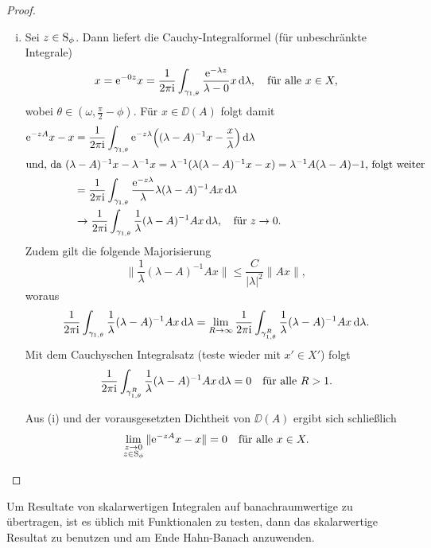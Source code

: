 \begin{proof}
\begin{enumerate}[(i)]
    \item Sei $z \in \mathrm{S}_\phi$. 
      Dann liefert die Cauchy-Integralformel (für unbeschränkte Integrale)
      $$
      x 
      = \mathrm{e}^{-0z} x
      = \frac{1}{2\pi \mathrm{i}} \int_{\gamma_{1,\theta}} \frac{\mathrm{e}^{-\lambda z}}{\lambda - 0} x \, {\operatorname{d}\!{\lambda}}, \quad\text{für alle } x \in X,
      $$
      wobei $\theta \in (\omega, \frac{\pi}{2} - \phi)$.
      Für $x \in \DD(A)$ folgt damit
     \begin{align*}
       \mathrm{e}^{-zA} x - x 
       &= \frac{1}{2\pi \mathrm{i}} \int_{\gamma_{1,\theta}} \mathrm{e}^{-z\lambda} \Big( (\lambda - A)^{-1} x - \frac{x}{\lambda} \Big) \, {\operatorname{d}\!{\lambda}}\\
       \intertext{und, da $(\lambda - A)^{-1} x - \lambda^{-1} x = \lambda^{-1}(\lambda(\lambda - A)^{-1}x - x) = \lambda^{-1} A (\lambda - A){-1}$, folgt weiter}
       &= \frac{1}{2\pi \mathrm{i}} \int_{\gamma_{1,\theta}} \frac{\mathrm{e}^{-z\lambda}}{\lambda}  \lambda (\lambda - A)^{-1} A x \, {\operatorname{d}\!{\lambda}} \\
       &\to \frac{1}{2\pi \mathrm{i}} \int_{\gamma_{1,\theta}} \frac{1}{\lambda} (\lambda - A)^{-1} A x \, {\operatorname{d}\!{\lambda}}, \quad \text{für } z \to 0.
     \end{align*}
     Zudem gilt die folgende Majorisierung
     $$
     \| \frac{1}{\lambda} (\lambda - A)^{-1} A x \| \leq \frac{C}{|\lambda|^2} \|A x \|,
     $$
     woraus 
     $$
     \frac{1}{2\pi \mathrm{i}} \int_{\gamma_{1,\theta}} \frac{1}{\lambda} (\lambda - A)^{-1} A x \, {\operatorname{d}\!{\lambda}} = \lim_{R \to \infty} \frac{1}{2\pi \mathrm{i}} \int_{\gamma_{1,\theta}^R} \frac{1}{\lambda} (\lambda - A)^{-1} A x \, {\operatorname{d}\!{\lambda}}.
     $$
     Mit dem Cauchyschen Integralsatz (teste wieder mit $x' \in X'$) folgt
     $$
     \frac{1}{2\pi \mathrm{i}} \int_{\gamma_{1,\theta}^R} \frac{1}{\lambda} (\lambda - A)^{-1} A x \, {\operatorname{d}\!{\lambda}} = 0 \quad\text{für alle }R > 1.
     $$

     Aus (i) und der vorausgesetzten Dichtheit von $\DD(A)$ ergibt sich schließlich
     \[
     \lim_{\substack{z \to 0\\ z \in \mathrm{S}_\phi}} \|\mathrm{e}^{-zA} x - x \| = 0 \quad\text{für alle } x \in X. \qedhere
     \]
  \end{enumerate}
\end{proof}

\begin{rem}
  Um Resultate von skalarwertigen Integralen auf banachraumwertige zu übertragen, ist es üblich mit Funktionalen zu testen, dann das skalarwertige Resultat zu benutzen und am Ende Hahn-Banach anzuwenden.
\end{rem}

